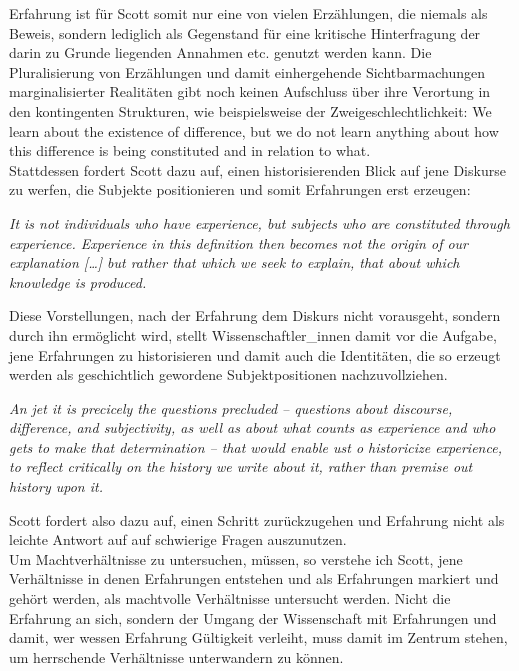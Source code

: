 \noindent Erfahrung ist für Scott somit nur eine von vielen
Erzählungen, die niemals als Beweis, sondern lediglich als Gegenstand für eine
kritische Hinterfragung der darin zu Grunde liegenden Annahmen etc. genutzt
werden kann. Die Pluralisierung von Erzählungen und damit einhergehende
Sichtbarmachungen marginalisierter Realitäten gibt noch keinen Aufschluss über
ihre Verortung in den kontingenten Strukturen, wie beispielsweise der
Zweigeschlechtlichkeit: \glqq We learn about the existence of difference, but we do
not learn anything about how this difference is being constituted and in
relation to what.\grqq \footnotemark {}\\  
Stattdessen fordert Scott dazu auf, einen historisierenden Blick auf jene Diskurse zu werfen, die Subjekte positionieren und somit Erfahrungen erst erzeugen:
\begin{myenv}
 \textit{\glqq 
It is not individuals who have experience, but subjects who are constituted through experience. Experience in this definition then becomes not the origin of our explanation […] but rather that which we seek to explain, that about which knowledge is produced.\grqq}\footnotemark{}
\end{myenv}
Diese Vorstellungen, nach der Erfahrung dem Diskurs nicht vorausgeht, sondern
durch ihn ermöglicht wird, stellt Wissenschaftler\_innen damit vor die Aufgabe,
jene Erfahrungen zu historisieren und damit auch die Identitäten, die so
erzeugt werden als geschichtlich gewordene Subjektpositionen nachzuvollziehen.
\begin{myenv}
 \textit{\glqq 
 An jet it is precicely the questions precluded – questions about discourse, difference, and subjectivity, as well as about what counts as experience and who gets to make that determination – that would enable ust o historicize experience, to reflect critically on the history we write about it, rather than premise out history upon it.\grqq}\footnotemark {}
\end{myenv}
Scott fordert also dazu auf, einen Schritt zurückzugehen und Erfahrung nicht
als leichte Antwort auf auf schwierige Fragen auszunutzen.\\

\noindent Um Machtverhältnisse
zu untersuchen, müssen, so verstehe ich Scott, jene Verhältnisse in denen
Erfahrungen entstehen und als Erfahrungen markiert und gehört werden, als
machtvolle Verhältnisse untersucht werden. Nicht die Erfahrung an sich, sondern
der Umgang der Wissenschaft mit Erfahrungen und damit, wer wessen Erfahrung
Gültigkeit verleiht, muss damit im Zentrum stehen, um herrschende Verhältnisse
unterwandern zu können.\\


